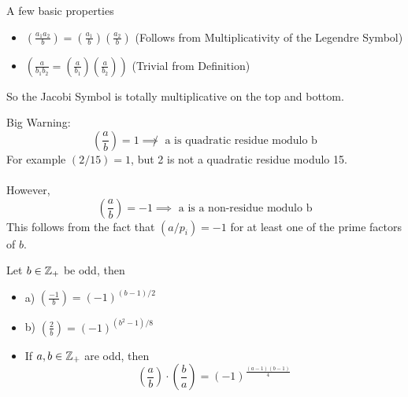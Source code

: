 \begin{proposition}
A few basic properties
\begin{itemize}
    \item $(\frac{a_1a_2}{b}) = (\frac{a_1}{b})(\frac{a_2}{b})$ (Follows from Multiplicativity of the Legendre Symbol)
    \item $(\frac{a}{b_1b_2} = (\frac{a}{b_1})(\frac{a}{b_2}))$ (Trivial from Definition)
\end{itemize}
So the Jacobi Symbol is totally multiplicative on the top and bottom.
\end{proposition}

\begin{example}
Big Warning:
\[(\frac{a}{b}) = 1 \not \implies \text{ a is quadratic residue modulo b}\]
For example $(2/15) = 1$, but 2 is not a quadratic residue modulo 15.\\\\
However,
\[(\frac{a}{b}) = -1 \implies \text{ a is a non-residue modulo b}\]
This follows from the fact that $(a/p_i) = -1$ for at least one of the prime factors of $b$.
\end{example}

\begin{proposition}
Let $b \in \mathbb{Z}_+$ be odd, then
\begin{itemize}
    \item a) $(\frac{-1}{b}) = (-1)^{(b-1)/2}$
    \item b) $(\frac{2}{b}) = (-1)^{(b^2-1)/8}$
    \item If $a, b \in \mathbb{Z}_+$ are odd, then
    \[(\frac{a}{b}) \cdot (\frac{b}{a}) = (-1)^{\frac{(a-1)(b-1)}{4}}\]
\end{itemize}
\end{proposition}